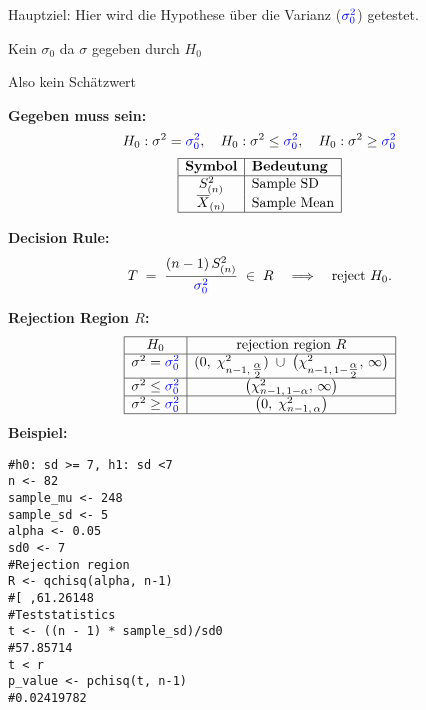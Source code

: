 \begin{center}
\end{center}
\normalsize

Hauptziel: Hier wird die Hypothese über die Varianz ($\textcolor{blue}{\sigma_0^2}$) getestet.
\begin{center}

\textcolor{red}{\warning} Kein $\sigma_0$ da $\sigma$ gegeben durch $H_0$\textcolor{red}{\warning}

\textcolor{red}{\warning} Also kein Schätzwert \textcolor{red}{\warning}
\end{center}
\large{\textbf{Gegeben muss sein:}}
\[
H_0: \sigma^2 = \textcolor{blue}{\sigma_0^2}, \quad H_0: \sigma^2 \leq \textcolor{blue}{\sigma_0^2}, \quad H_0: \sigma^2 \geq \textcolor{blue}{\sigma_0^2}
\]
\[
\begin{array}{|c|l|}
\hline
\textbf{Symbol} & \textbf{Bedeutung} \\
\hline
S_{(n)}^2& \text{Sample SD} \\
\overline{X}_{(n)} & \text{Sample Mean} \\
\hline
\end{array}
\]
\begin{comment}
\large{\textbf{Teststatistic:}}
\[
T \;=\; \frac{(n-1)\,S_{(n)}^2}{\textcolor{blue}{\sigma^2}}
\;\;\sim\;\;\chi^2_{n-1}
\quad\text{with}\quad
S_{(n)}^2
\;=\;
\frac{1}{n-1}\sum_{i=1}^n
\bigl(X_i - \overline{X}_{(n)}\bigr)^2.
\]
\end{comment}

\large{\textbf{Decision Rule:}}
\[
T
\;=\;
\frac{(n-1)\,S_{(n)}^2}{\textcolor{blue}{\sigma_0^2}}
\;\in\; R
\quad\Longrightarrow\quad
\text{reject }H_0.
\]

\large{\textbf{Rejection Region \(R\):}}
\[
\begin{array}{|c|c|}
\hline
H_0 & \text{rejection region } R \\
\hline
\sigma^2 = \textcolor{blue}{\sigma_0^2}
&
(0,\;\chi^2_{n-1,\,\tfrac{\alpha}{2}})
\;\cup\;
\bigl(\chi^2_{n-1,\,1-\tfrac{\alpha}{2}},\,\infty\bigr)
\\ \hline
\sigma^2 \leq \textcolor{blue}{\sigma_0^2}
&
\bigl(\chi^2_{n-1,\,1-\alpha},\,\infty\bigr)
\\ \hline
\sigma^2 \geq \textcolor{blue}{\sigma_0^2}
&
\bigl(0,\;\chi^2_{n-1,\,\alpha}\bigr)
\\ \hline
\end{array}
\]
\large{\textbf{Beispiel:}}
\begin{lstlisting}
#h0: sd >= 7, h1: sd <7
n <- 82
sample_mu <- 248
sample_sd <- 5
alpha <- 0.05
sd0 <- 7
#Rejection region 
R <- qchisq(alpha, n-1)
#[ ,61.26148
#Teststatistics
t <- ((n - 1) * sample_sd)/sd0
#57.85714
t < r
p_value <- pchisq(t, n-1)
#0.02419782
\end{lstlisting}
\columnbreak
\begin{center}
\end{center}
\normalsize

